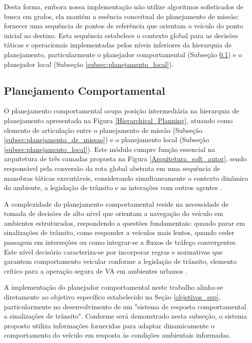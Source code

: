 Desta forma, embora nossa implementação não utilize algoritmos sofisticados de busca em grafos, ela mantém a essência conceitual do planejamento de missão: fornecer uma sequência de pontos de referência que orientam o veículo do ponto inicial ao destino. Esta sequência estabelece o contexto global para as decisões táticas e operacionais implementadas pelos níveis inferiores da hierarquia de planejamento, particularmente o planejador comportamental (Subseção \ref{subsec:planejamento_comportamental}) e o planejador local (Subseção \ref{subsec:planejamento_local}).

\subsection{Planejamento Comportamental} \label{subsec:planejamento_comportamental}

O planejamento comportamental ocupa posição intermediária na hierarquia de planejamento apresentada na Figura \ref{Hierarchical_Planning}, atuando como elemento de articulação entre o planejamento de missão (Subseção \ref{subsec:planejamento_de_missao}) e o planejamento local (Subseção \ref{subsec:planejamento_local}). Este módulo cumpre função essencial na arquitetura de três camadas proposta na Figura \ref{Arquitetura_soft_autor}, sendo responsável pela conversão da rota global abstrata em uma sequência de manobras táticas executáveis, considerando simultaneamente o contexto dinâmico do ambiente, a legislação de trânsito e as interações com outros agentes \cite{University_of_Toronto2018-mp}.

A complexidade do planejamento comportamental reside na necessidade de tomada de decisões de alto nível que orientam a navegação do veículo em ambientes estruturados, respondendo a questões fundamentais: quando parar em sinalizações de trânsito, como responder a veículos mais lentos, quando ceder passagem em interseções ou como integrar-se a fluxos de tráfego convergentes. Este nível decisório caracteriza-se por incorporar regras e normativas que garantem comportamento veicular conforme a legislação de trânsito, elemento crítico para a operação segura de VA em ambientes urbanos \cite{wei2014behavioral, paden2016survey}.

A implementação do planejador comportamental neste trabalho alinha-se diretamente ao objetivo específico estabelecido na Seção \ref{objetivos_esp}, particularmente no desenvolvimento de um "sistema de resposta comportamental a sinalizações de trânsito". Conforme será demonstrado nesta subseção, o sistema proposto utiliza informações fornecidas para adaptar dinamicamente o comportamento do veículo em resposta às condições ambientais informadas.

